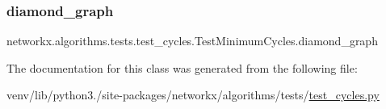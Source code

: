 \subsubsection{\texorpdfstring{diamond\+\_\+graph}{diamond\_graph}}
{\footnotesize\ttfamily networkx.\+algorithms.\+tests.\+test\+\_\+cycles.\+Test\+Minimum\+Cycles.\+diamond\+\_\+graph}



The documentation for this class was generated from the following file\+:\begin{DoxyCompactItemize}
\item 
venv/lib/python3./site-\/packages/networkx/algorithms/tests/\hyperlink{networkx_2algorithms_2tests_2test__cycles_8py}{test\+\_\+cycles.\+py}\end{DoxyCompactItemize}
